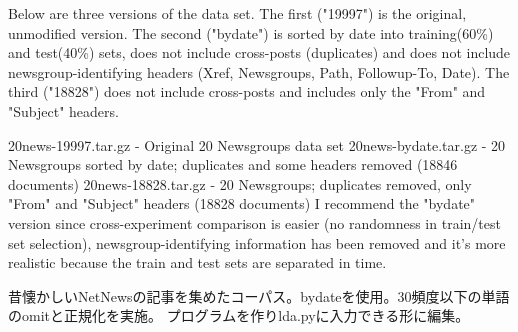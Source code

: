 \documentclass[uplatex,dvipdfmx]{jsarticle}
\begin{document}
Below are three versions of the data set. The first ("19997") is the original, unmodified version. The second ("bydate") is sorted by date into training(60\%) and test(40\%) sets, does not include cross-posts (duplicates) and does not include newsgroup-identifying headers (Xref, Newsgroups, Path, Followup-To, Date). The third ("18828") does not include cross-posts and includes only the "From" and "Subject" headers.

20news-19997.tar.gz - Original 20 Newsgroups data set
20news-bydate.tar.gz - 20 Newsgroups sorted by date; duplicates and some headers removed (18846 documents)
20news-18828.tar.gz - 20 Newsgroups; duplicates removed, only "From" and "Subject" headers (18828 documents)
I recommend the "bydate" version since cross-experiment comparison is easier (no randomness in train/test set selection), newsgroup-identifying information has been removed and it's more realistic because the train and test sets are separated in time.

昔懐かしいNetNewsの記事を集めたコーパス。bydateを使用。30頻度以下の単語のomitと正規化を実施。
プログラムを作りlda.pyに入力できる形に編集。
\end{document}
